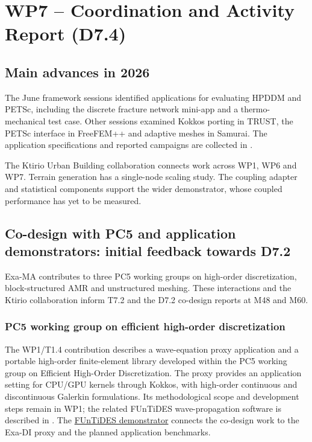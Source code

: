 
\chapter{WP7 -- Coordination and Activity Report (D7.4)}
\label{chap:wp7}

\section{Main advances in 2026}
\label{sec:wp7-main-advances-2026}

The June framework sessions identified applications for evaluating
HPDDM and PETSc, including the discrete fracture network mini-app and
a thermo-mechanical test case. Other sessions examined Kokkos porting
in TRUST, the PETSc interface in FreeFEM++ and adaptive meshes in
Samurai. The application specifications
and reported campaigns are collected in .

The Ktirio Urban Building collaboration connects work across WP1,
WP6 and WP7. Terrain generation has a single-node scaling study. The
coupling adapter and statistical components support the wider
demonstrator, whose coupled performance has yet to be measured.

\section{Co-design with PC5 and application demonstrators: initial feedback towards D7.2}
\label{sec:wp7:codesign-initial-feedback}

Exa-MA contributes to three PC5 working groups on high-order
discretization, block-structured AMR and unstructured meshing. These
interactions and the Ktirio collaboration inform T7.2 and the D7.2
co-design reports at M48 and M60.

\subsection{PC5 working group on efficient high-order discretization}

The WP1/T1.4 contribution describes a wave-equation proxy application
and a portable high-order finite-element library developed within the PC5
working group on Efficient High-Order Discretization. The proxy provides
an application setting for CPU/GPU kernels through Kokkos, with high-order
continuous and discontinuous Galerkin formulations. Its methodological scope
and development steps remain in WP1; the related FUnTiDES wave-propagation
software is described in . The
\hyperref[sec:pc5:funtides]{FUnTiDES demonstrator} connects the
co-design work to the Exa-DI proxy and the planned application benchmarks.

